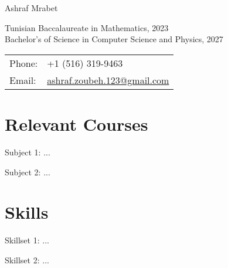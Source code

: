 \documentclass[letterpaper]{article}
\def\name{Ashraf Mrabet}
\renewenvironment{itemize}{
	\begin{list}{}{
			\setlength{\leftmargin}{1.5em}
		}
	}{
	\end{list}
}
\begin{document}
	
	{\huge \name}
	
	\vspace{0.25in}

	\begin{minipage}{0.50\linewidth}
		Tunisian Baccalaureate in Mathematics, 2023\\
		Bachelor's of Science in Computer Science and Physics, 2027\\
	\end{minipage}
	\begin{minipage}{0.4\linewidth}
		\begin{tabular}{ll}
			Phone: & +1 (516) 319-9463 \\
			Email: & \href{mailto:ashraf.zoubeh.123@gmail.com}{ashraf.zoubeh.123@gmail.com} \\
		\end{tabular}
	\end{minipage}

	\section*{Relevant Courses} %
	\begin{itemize}
		\item {\large Subject 1}: ...

		\item {\large Subject 2}: ...
	\end{itemize}

	\section*{Skills} %
	\begin{itemize}
		\item {\large Skillset 1}: ...

		\item {\large Skillset 2}: ...
	\end{itemize}
\end{document}
